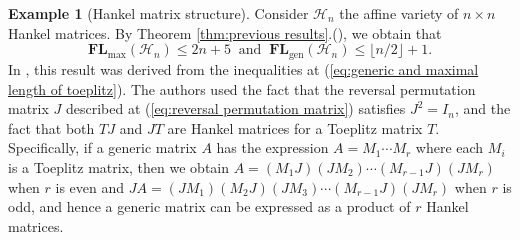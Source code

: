\documentclass[reqno]{amsart}
\theoremstyle{definition}
\newtheorem{example}[theorem]{Example}
\numberwithin{equation}{section}
\begin{document}
\begin{example}[Hankel matrix structure]\label{ex:Hankel}
    Consider $\mathcal{H}_n$ the affine variety of $n \times n$ Hankel matrices. By Theorem \ref{thm:previous results}.(), we obtain that
    \begin{equation*}
        \mathbf{FL}_{\text{max}}(\mathcal{H}_n) \leq 2n+5~\text{ and }~\mathbf{FL}_{\text{gen}}(\mathcal{H}_n) \leq \lfloor n/2 \rfloor +1.
    \end{equation*}
    In \cite{ye2016every}, this result was derived from the inequalities at (\ref{eq:generic and maximal length of toeplitz}). The authors used the fact that the reversal permutation matrix $J$ described at (\ref{eq:reversal permutation matrix}) satisfies $J^2=I_n$, and the fact that both $TJ$ and $JT$ are Hankel matrices for a Toeplitz matrix $T$. Specifically, if a generic matrix $A$ has the expression $A=M_1\cdots M_r$ where each $M_i$ is a Toeplitz matrix, then we obtain $A=(M_1J)(JM_2)\cdots (M_{r-1}J)(JM_r)$ when $r$ is even and $JA=(JM_1)(M_2J)(JM_3)\cdots(M_{r-1}J)(JM_r)$ when $r$ is odd, and hence a generic matrix can be expressed as a product of $r$ Hankel matrices.


\end{example}
\end{document}
